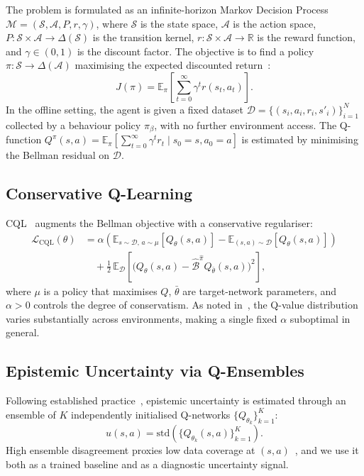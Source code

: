 \documentclass[conference]{IEEEtran}
\begin{document}
The problem is formulated as an infinite-horizon Markov Decision Process
$\mathcal{M} = (\mathcal{S}, \mathcal{A}, P, r, \gamma)$, where
$\mathcal{S}$ is the state space, $\mathcal{A}$ is the action space,
$P: \mathcal{S}\times\mathcal{A} \to \Delta(\mathcal{S})$ is the transition
kernel, $r: \mathcal{S}\times\mathcal{A}\to\mathbb{R}$ is the reward
function, and $\gamma \in (0,1)$ is the discount factor. The objective is to
find a policy $\pi: \mathcal{S}\to\Delta(\mathcal{A})$ maximising the
expected discounted return~\cite{levine2020offline}:
\begin{equation}
  J(\pi) = \mathbb{E}_{\pi}\!\left[\sum_{t=0}^{\infty}\gamma^t r(s_t,a_t)\right].
  \label{eq:objective}
\end{equation}
In the offline setting, the agent is given a fixed dataset
$\mathcal{D} = \{(s_i,a_i,r_i,s'_i)\}_{i=1}^{N}$ collected by a behaviour
policy $\pi_\beta$, with no further environment access. The Q-function
$Q^\pi(s,a) = \mathbb{E}_\pi[\sum_{t=0}^\infty \gamma^t r_t \mid s_0{=}s,
a_0{=}a]$ is estimated by minimising the Bellman residual on $\mathcal{D}$.

\subsection{Conservative Q-Learning}

CQL~\cite{kumar2020conservative} augments the Bellman objective with a
conservative regulariser:
\begin{align}
  \mathcal{L}_{\mathrm{CQL}}(\theta)
  &= \alpha\!\left(\mathbb{E}_{s\sim\mathcal{D},\,a\sim\mu}[Q_\theta(s,a)]
    - \mathbb{E}_{(s,a)\sim\mathcal{D}}[Q_\theta(s,a)]\right) \nonumber \\
  &\quad + \tfrac{1}{2}\,\mathbb{E}_{\mathcal{D}}
    \!\left[\bigl(Q_\theta(s,a)-\hat{\mathcal{B}}^{\hat\pi}Q_{\bar\theta}(s,a)
    \bigr)^2\right],
  \label{eq:cql}
\end{align}
where $\mu$ is a policy that maximises $Q$, $\bar\theta$ are
target-network parameters, and $\alpha{>}0$ controls the degree of
conservatism. As noted in~\cite{liu2023aptq}, the Q-value distribution
varies substantially across environments, making a single fixed $\alpha$
suboptimal in general.

\subsection{Epistemic Uncertainty via Q-Ensembles}

Following established practice~\cite{an2021pbrl,wu2021uncertainty}, epistemic
uncertainty is estimated through an ensemble of $K$ independently
initialised Q-networks $\{Q_{\theta_k}\}_{k=1}^K$:
\begin{equation}
  u(s,a) = \mathrm{std}\!\left(\{Q_{\theta_k}(s,a)\}_{k=1}^K\right).
  \label{eq:uncertainty}
\end{equation}
High ensemble disagreement proxies low data coverage at
$(s,a)$~\cite{an2021pbrl}, and we use it both as a trained baseline and as a
diagnostic uncertainty signal.
\end{document}
